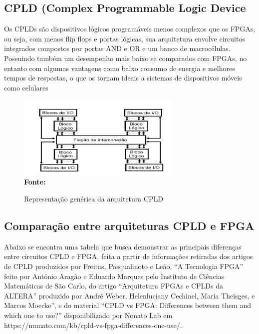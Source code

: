 \subsection{\esp CPLD (Complex Programmable Logic Device}

Os CPLDs são dispositivos lógicos programáveis menos complexos que os FPGAs, ou seja, com menos flip flops e portas lógicas, sua arquitetura envolve circuitos integrados compostos por portas AND e OR e um banco de macrocélulas. Possuindo também um desempenho mais baixo se comparados com FPGAs, no entanto com algumas vantagens como baixo consumo de energia e melhores tempos de respostas, o que os tornam ideais a sistemas de dispositivos móveis como celulares
\cite{Weber2016}

\vspace{-0.2cm}
\begin{figure}[ht]
	\centering	
	\caption{Representação genérica da arquitetura CPLD}
	\vspace{-0.4cm}
	\includegraphics[width=0.7\textwidth]{figuras/Figura5.png}
	 \vspace{-0.2cm}
	\\\textbf{\footnotesize Fonte:  }
	\label{fig:figura5}
\end{figure}
\vspace{-0.5cm}

\subsection{\esp Comparação entre arquiteturas CPLD e FPGA}

Abaixo se encontra uma tabela que busca demonstrar as principais diferenças entre circuitos CPLD e FPGA, feita a partir de informações retiradas dos  artigos de CPLD produzidos por Freitas, Pasqualinoto e Leão, “A Tecnologia FPGA”  feito por António Aragão e Eduardo Marques pelo Instituto de Ciências Matemáticas de São Carlo, do artigo “Arquitetura FPGAs e CPLDs da ALTERA” produzido por André Weber, Helenluciany Cechinel, Maria Theisges, e Marcos Moecke”, e do material “CPLD vs FPGA: Differences between them and which one to use?” disponibilizado por Nonato Lab em https://numato.com/kb/cpld-vs-fpga-differences-one-use/.

